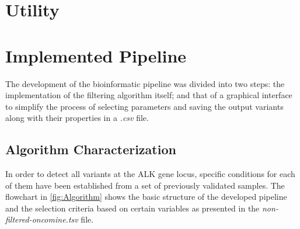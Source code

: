 \section{Utility}








\section{Implemented Pipeline}

The development of the bioinformatic pipeline was divided into two steps: the implementation of the filtering algorithm itself; and that of a graphical interface to simplify the process of selecting parameters and saving the output variants along with their properties in a \textit{.csv} file.

\subsection{Algorithm Characterization}

In order to detect all variants at the ALK gene locus, specific conditions for each of them have been established from a set of previously validated samples. The flowchart in \autoref{fig:Algorithm} shows the basic structure of the developed pipeline and the selection criteria based on certain variables as presented in the \textit{non-filtered-oncomine.tsv} file.

